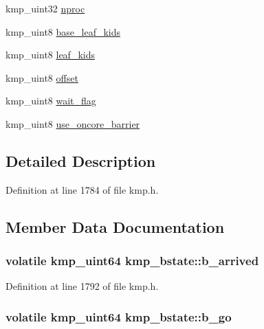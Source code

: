 \begin{DoxyCompactItemize}
kmp\-\_\-uint32 \hyperlink{structkmp__bstate_a4f6dcc9e0b14e7c62f6b90bac37875b2}{nproc}
\item 
kmp\-\_\-uint8 \hyperlink{structkmp__bstate_af4b300647701635112333890bd276a5d}{base\-\_\-leaf\-\_\-kids}
\item 
kmp\-\_\-uint8 \hyperlink{structkmp__bstate_a39d8977f4bd79dbfae45fb58f1fc22fe}{leaf\-\_\-kids}
\item 
kmp\-\_\-uint8 \hyperlink{structkmp__bstate_a6b2ff7524147c480ec05972267ddb874}{offset}
\item 
kmp\-\_\-uint8 \hyperlink{structkmp__bstate_a0247461ecd2e0778986c49789fe9812d}{wait\-\_\-flag}
\item 
kmp\-\_\-uint8 \hyperlink{structkmp__bstate_a76d7182b9224f9a340803e0f9de877da}{use\-\_\-oncore\-\_\-barrier}
\end{DoxyCompactItemize}


\subsection{Detailed Description}


Definition at line 1784 of file kmp.\-h.



\subsection{Member Data Documentation}
\hypertarget{structkmp__bstate_a7467d3c14340048c5ecb4e5ae6b5ba0e}{
\subsubsection[{b\-\_\-arrived}]{ volatile kmp\-\_\-uint64 kmp\-\_\-bstate\-::b\-\_\-arrived}}\label{structkmp__bstate_a7467d3c14340048c5ecb4e5ae6b5ba0e}


Definition at line 1792 of file kmp.\-h.

\hypertarget{structkmp__bstate_a5683452af6bb4ec4bf0862985bc6765f}{
\subsubsection[{b\-\_\-go}]{\setlength{\rightskip}{0pt plus 5cm}volatile kmp\-\_\-uint64 kmp\-\_\-bstate\-::b\-\_\-go}}\label{structkmp__bstate_a5683452af6bb4ec4bf0862985bc6765f}


